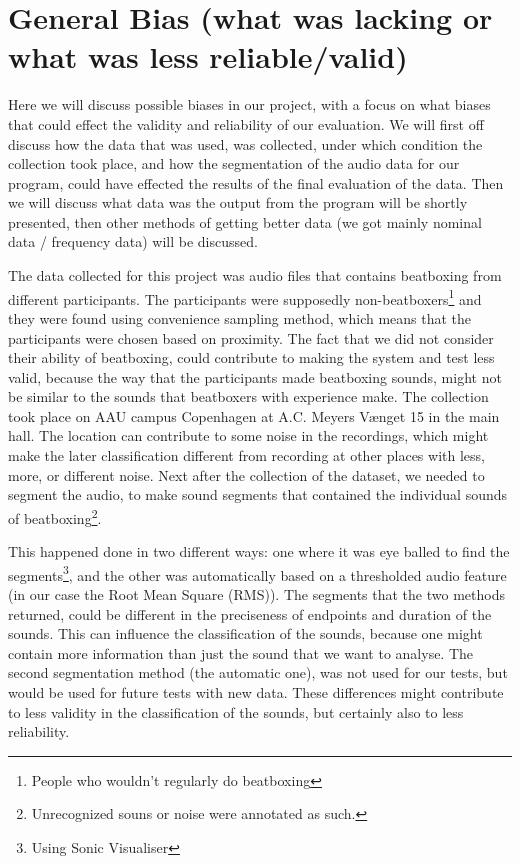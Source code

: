 \section{General Bias (what was lacking or what was less reliable/valid)}
Here we will discuss possible biases in our project, with a focus on what biases that could effect the validity and reliability of our evaluation. We will first off discuss how the data that was used, was collected, under which condition the collection took place, and how the segmentation of the audio data for our program, could have effected the results of the final evaluation of the data. Then we will discuss what data was the output from the program will be shortly presented, then other methods of getting better data (we got mainly nominal data / frequency data) will be discussed.

The data collected for this project was audio files that contains beatboxing from different participants. The participants were supposedly non-beatboxers\footnote{People who wouldn't regularly do beatboxing} and they were found using convenience sampling method, which means that the participants were chosen based on proximity. The fact that we did not consider their ability of beatboxing, could contribute to making the system and test less valid, because the way that the participants made beatboxing sounds, might not be similar to the sounds that beatboxers with experience make. The collection took place on AAU campus Copenhagen at A.C. Meyers Vænget 15 in the main hall. The location can contribute to some noise in the recordings, which might make the later classification different from recording at other places with less, more, or different noise. Next after the collection of the dataset, we needed to segment the audio, to make sound segments that contained the individual sounds of beatboxing\footnote{Unrecognized souns or noise were annotated as such.}. 

This happened done in two different ways: one where it was eye balled to find the segments\footnote{Using Sonic Visualiser}, and the other was automatically based on a thresholded audio feature (in our case the Root Mean Square (RMS)). The segments that the two methods returned, could be different in the preciseness of endpoints and duration of the sounds. This can influence the classification of the sounds, because one might contain more information than just the sound that we want to analyse. The second segmentation method (the automatic one), was not used for our tests, but would be used for future tests with new data. These differences might contribute to less validity in the classification of the sounds, but certainly also to less reliability.

